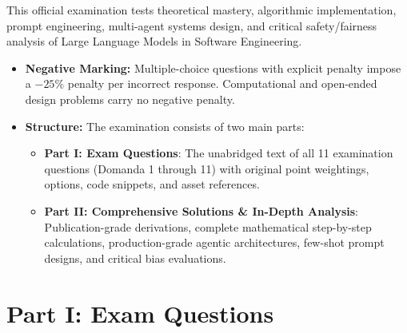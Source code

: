 \documentclass[11pt,a4paper]{article}
\begin{document}
\begin{tcolorbox}[colback=primary!5,colframe=primary,arc=2mm,boxrule=1pt,title=\textbf{Examination Instructions and Structure}]
This official examination tests theoretical mastery, algorithmic implementation, prompt engineering, multi-agent systems design, and critical safety/fairness analysis of Large Language Models in Software Engineering.
\begin{itemize}[leftmargin=1.5em,itemsep=1pt]
    \item \textbf{Negative Marking:} Multiple-choice questions with explicit penalty impose a $-25\%$ penalty per incorrect response. Computational and open-ended design problems carry no negative penalty.
    \item \textbf{Structure:} The examination consists of two main parts:
    \begin{itemize}[leftmargin=1.2em,itemsep=1pt]
        \item \textbf{Part I: Exam Questions}: The unabridged text of all 11 examination questions (Domanda 1 through 11) with original point weightings, options, code snippets, and asset references.
        \item \textbf{Part II: Comprehensive Solutions \& In-Depth Analysis}: Publication-grade derivations, complete mathematical step-by-step calculations, production-grade agentic architectures, few-shot prompt designs, and critical bias evaluations.
    \end{itemize}
\end{itemize}
\end{tcolorbox}

\vspace{0.4cm}

\section{Part I: Exam Questions}
\end{document}

